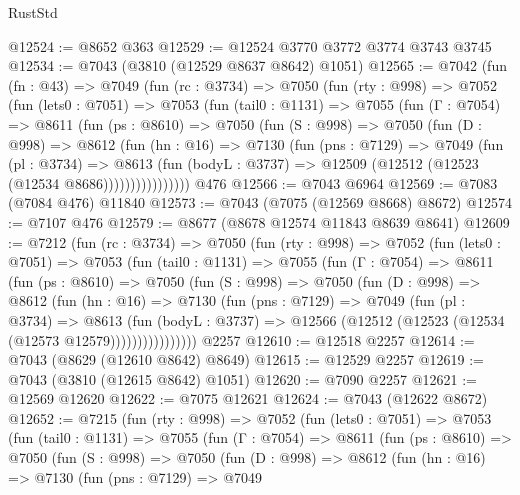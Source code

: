 \begin{lexlean}{RustStd}
\begin{coremodule}
@12524 := @8652 @363
@12529 := @12524 @3770 @3772 @3774 @3743 @3745
@12534 := @7043 (@3810 (@12529 @8637 @8642) @1051)
@12565 := @7042
    (fun (fn : @43) =>
    @7049
      (fun (rc : @3734) =>
      @7050
        (fun (rty : @998) =>
        @7052
          (fun (lets0 : @7051) =>
          @7053
            (fun (tail0 : @1131) =>
            @7055
              (fun (Γ : @7054) =>
              @8611
                (fun (ps : @8610) =>
                @7050
                  (fun (S : @998) =>
                  @7050
                    (fun (D : @998) =>
                    @8612
                      (fun (hn : @16) =>
                      @7130
                        (fun (pns : @7129) =>
                        @7049
                          (fun (pl : @3734) =>
                          @8613
                            (fun (bodyL : @3737) =>
                            @12509 (@12512 (@12523 (@12534 @8686))))))))))))))))
    @476
@12566 := @7043 @6964
@12569 := @7083 (@7084 @476) @11840
@12573 := @7043 (@7075 (@12569 @8668) @8672)
@12574 := @7107 @476
@12579 := @8677 (@8678 @12574 @11843 @8639 @8641)
@12609 := @7212
    (fun (rc : @3734) =>
    @7050
      (fun (rty : @998) =>
      @7052
        (fun (lets0 : @7051) =>
        @7053
          (fun (tail0 : @1131) =>
          @7055
            (fun (Γ : @7054) =>
            @8611
              (fun (ps : @8610) =>
              @7050
                (fun (S : @998) =>
                @7050
                  (fun (D : @998) =>
                  @8612
                    (fun (hn : @16) =>
                    @7130
                      (fun (pns : @7129) =>
                      @7049
                        (fun (pl : @3734) =>
                        @8613
                          (fun (bodyL : @3737) =>
                          @12566 (@12512 (@12523 (@12534 (@12573 @12579))))))))))))))))
    @2257
@12610 := @12518 @2257
@12614 := @7043 (@8629 (@12610 @8642) @8649)
@12615 := @12529 @2257
@12619 := @7043 (@3810 (@12615 @8642) @1051)
@12620 := @7090 @2257
@12621 := @12569 @12620
@12622 := @7075 @12621
@12624 := @7043 (@12622 @8672)
@12652 := @7215
    (fun (rty : @998) =>
    @7052
      (fun (lets0 : @7051) =>
      @7053
        (fun (tail0 : @1131) =>
        @7055
          (fun (Γ : @7054) =>
          @8611
            (fun (ps : @8610) =>
            @7050
              (fun (S : @998) =>
              @7050
                (fun (D : @998) =>
                @8612
                  (fun (hn : @16) =>
                  @7130
                    (fun (pns : @7129) =>
                    @7049

\end{coremodule}
\end{lexlean}
